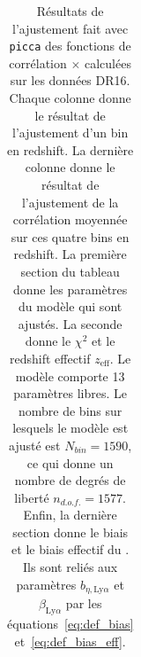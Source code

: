 \begin{table}[]
  \centering
  \caption{Résultats de l'ajustement fait avec \texttt{picca} des fonctions de corrélation \lya{}$\times$\lya{} calculées sur les données DR16. Chaque colonne donne le résultat de l'ajustement d'un bin en redshift. La dernière colonne donne le résultat de l'ajustement de la corrélation moyennée sur ces quatre bins en redshift. La première section du tableau donne les paramètres du modèle qui sont ajustés. La seconde donne le $\chi^2$ et le redshift effectif $z_{\mathrm{eff}}$. Le modèle comporte \num{13} paramètres libres. Le nombre de bins sur lesquels le modèle est ajusté est $N_{bin} = \num{1590}$, ce qui donne un nombre de degrés de liberté $n_{d.o.f.} = \num{1577}$. Enfin, la dernière section donne le biais et le biais effectif du \lya{}. Ils sont reliés aux paramètres $b_{\eta, \mathrm{Ly}\alpha}$ et $\beta_{\mathrm{Ly}\alpha}$ par les équations~\ref{eq:def_bias} et~\ref{eq:def_bias_eff}.}
  \label{tab:dr16_4bins}
  \footnotesize
  \begin{tabular}{lccccc}

\end{tabular}
\end{table}
